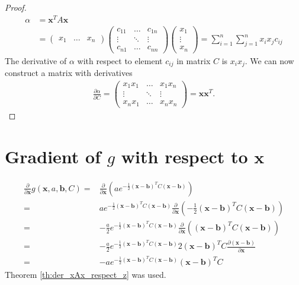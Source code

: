 \documentclass{paper}
\newcommand{\vr}[1]{\ensuremath{\boldsymbol{#1}}}
\newcommand{\mx}[1]{\ensuremath{#1}}
\begin{document}
\begin{proof}
	\begin{align}
		\alpha &= \vr{x}^T \mx{A} \vr{x} \\
		&=
		\begin{pmatrix}
			x_1 & \ldots & x_n
		\end{pmatrix}
		\begin{pmatrix}
			c_{11} & \ldots & c_{1n} \\
			\vdots & \ddots & \vdots \\
			c_{n1} & \ldots & c_{nn}
		\end{pmatrix}
		\begin{pmatrix}
			x_1 \\
			\vdots \\
			x_n
		\end{pmatrix} = \sum_{i=1}^{n} \sum_{j=1}^{n} x_i x_j c_{ij}
	\end{align}
	The derivative of $\alpha$ with respect to element $c_{ij}$ in matrix $\mx{C}$ is $x_i x_j$.
	We can now construct a matrix with derivatives
	\begin{align}
		\frac{\partial \alpha}{\partial \mx{C}} =
		\begin{pmatrix}
			x_{1}x_{1} & \ldots & x_{1}x_{n} \\
			\vdots & \ddots & \vdots \\
			x_{n}x_{1} & \ldots & x_{n}x_{n}
		\end{pmatrix} = \vr{x} \vr{x}^T.
	\end{align}
\end{proof}

\section{Gradient of $g$ with respect to $\vr{x}$}
\begin{align}
	\frac{\partial}{\partial \vr{x}} g(\vr{x}, a, \vr{b}, C) =& \frac{\partial}{\partial \vr{x}} \left(a e^{-\frac{1}{2}(\vr{x}-\vr{b})^T C(\vr{x}-\vr{b})} \right) \nonumber \\
	=& a e^{-\frac{1}{2}(\vr{x}-\vr{b})^TC(\vr{x}-\vr{b})} \frac{\partial}{\partial \vr{x}} \left(-\frac{1}{2}(\vr{x}-\vr{b})^T C(\vr{x}-\vr{b})\right) \nonumber \\
	=& -\frac{a}{2} e^{-\frac{1}{2}(\vr{x}-\vr{b})^TC(\vr{x}-\vr{b})} \frac{\partial}{\partial \vr{x}} \left((\vr{x}-\vr{b})^T C(\vr{x}-\vr{b})\right) \nonumber \\
	=& -\frac{a}{2} e^{-\frac{1}{2}(\vr{x}-\vr{b})^TC(\vr{x}-\vr{b})} 2 (\vr{x}-\vr{b})^T C \frac{\partial (\vr{x}-\vr{b})}{\partial \vr{x}} \nonumber \\
	=& -a e^{-\frac{1}{2}(\vr{x}-\vr{b})^TC(\vr{x}-\vr{b})} (\vr{x}-\vr{b})^T C
\end{align}
Theorem \ref{th:der_xAx_respect_z} was used.
\end{document}
